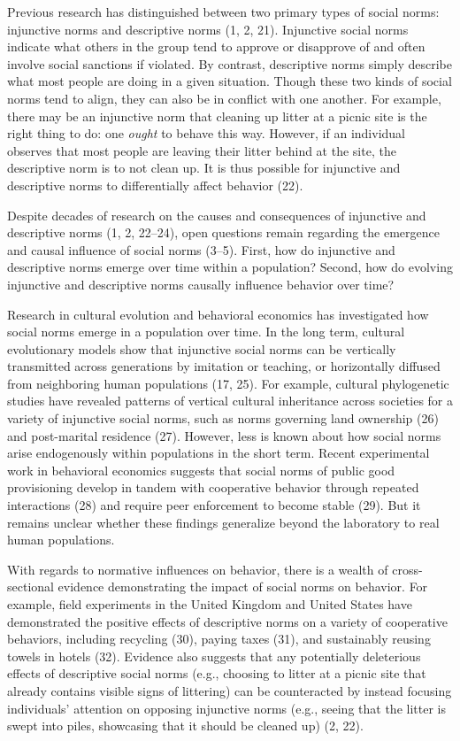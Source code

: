 \documentclass[
  man, donotrepeattitle,floatsintext]{apa6}
\begin{document}
Previous research has distinguished between two primary types of social norms: injunctive norms and descriptive norms (1, 2, 21). Injunctive social norms indicate what others in the group tend to approve or disapprove of and often involve social sanctions if violated. By contrast, descriptive norms simply describe what most people are doing in a given situation. Though these two kinds of social norms tend to align, they can also be in conflict with one another. For example, there may be an injunctive norm that cleaning up litter at a picnic site is the right thing to do: one \emph{ought} to behave this way. However, if an individual observes that most people are leaving their litter behind at the site, the descriptive norm is to not clean up. It is thus possible for injunctive and descriptive norms to differentially affect behavior (22).

Despite decades of research on the causes and consequences of injunctive and descriptive norms (1, 2, 22--24), open questions remain regarding the emergence and causal influence of social norms (3--5). First, how do injunctive and descriptive norms emerge over time within a population? Second, how do evolving injunctive and descriptive norms causally influence behavior over time?

Research in cultural evolution and behavioral economics has investigated how social norms emerge in a population over time. In the long term, cultural evolutionary models show that injunctive social norms can be vertically transmitted across generations by imitation or teaching, or horizontally diffused from neighboring human populations (17, 25). For example, cultural phylogenetic studies have revealed patterns of vertical cultural inheritance across societies for a variety of injunctive social norms, such as norms governing land ownership (26) and post-marital residence (27). However, less is known about how social norms arise endogenously within populations in the short term. Recent experimental work in behavioral economics suggests that social norms of public good provisioning develop in tandem with cooperative behavior through repeated interactions (28) and require peer enforcement to become stable (29). But it remains unclear whether these findings generalize beyond the laboratory to real human populations.

With regards to normative influences on behavior, there is a wealth of cross-sectional evidence demonstrating the impact of social norms on behavior. For example, field experiments in the United Kingdom and United States have demonstrated the positive effects of descriptive norms on a variety of cooperative behaviors, including recycling (30), paying taxes (31), and sustainably reusing towels in hotels (32). Evidence also suggests that any potentially deleterious effects of descriptive social norms (e.g., choosing to litter at a picnic site that already contains visible signs of littering) can be counteracted by instead focusing individuals' attention on opposing injunctive norms (e.g., seeing that the litter is swept into piles, showcasing that it should be cleaned up) (2, 22).
\end{document}
